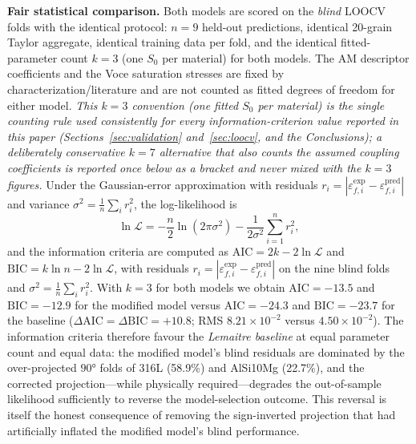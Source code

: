 \documentclass[twocolumn]{sagej}
\begin{document}
\textbf{Fair statistical comparison.} Both models are scored on the \emph{blind} LOOCV folds with the identical protocol: $n = 9$ held-out predictions, identical 20-grain Taylor aggregate, identical training data per fold, and the identical fitted-parameter count $k = 3$ (one $S_0$ per material) for both models. The AM descriptor coefficients and the Voce saturation stresses are fixed by characterization/literature and are not counted as fitted degrees of freedom for either model. \emph{This $k=3$ convention (one fitted $S_0$ per material) is the single counting rule used consistently for every information-criterion value reported in this paper (Sections~\ref{sec:validation} and~\ref{sec:loocv}, and the Conclusions); a deliberately conservative $k=7$ alternative that also counts the assumed coupling coefficients is reported once below as a bracket and never mixed with the $k=3$ figures.} Under the Gaussian-error approximation with residuals $r_i = |\varepsilon_{f,i}^{\mathrm{exp}} - \varepsilon_{f,i}^{\mathrm{pred}}|$ and variance $\sigma^2 = \frac{1}{n}\sum_i r_i^2$, the log-likelihood is
\begin{equation}
\ln \mathcal{L} = -\frac{n}{2}\ln(2\pi\sigma^2) - \frac{1}{2\sigma^2}\sum_{i=1}^{n} r_i^2,
\label{eq:loglike}
\end{equation}
and the information criteria are computed as $\mathrm{AIC} = 2k - 2\ln\mathcal{L}$ and $\mathrm{BIC} = k\ln n - 2\ln\mathcal{L}$, with residuals $r_i = |\varepsilon_{f,i}^{\mathrm{exp}} - \varepsilon_{f,i}^{\mathrm{pred}}|$ on the nine blind folds and $\sigma^2 = \frac{1}{n}\sum_i r_i^2$. With $k = 3$ for both models we obtain $\mathrm{AIC} = -13.5$ and $\mathrm{BIC} = -12.9$ for the modified model versus $\mathrm{AIC} = -24.3$ and $\mathrm{BIC} = -23.7$ for the baseline ($\Delta\mathrm{AIC} = \Delta\mathrm{BIC} = +10.8$; RMS $8.21\times10^{-2}$ versus $4.50\times10^{-2}$). The information criteria therefore favour the \emph{Lemaitre baseline} at equal parameter count and equal data: the modified model's blind residuals are dominated by the over-projected $\ang{90}$ folds of 316L (58.9\%) and AlSi10Mg (22.7\%), and the corrected projection---while physically required---degrades the out-of-sample likelihood sufficiently to reverse the model-selection outcome. This reversal is itself the honest consequence of removing the sign-inverted projection that had artificially inflated the modified model's blind performance.
\end{document}
